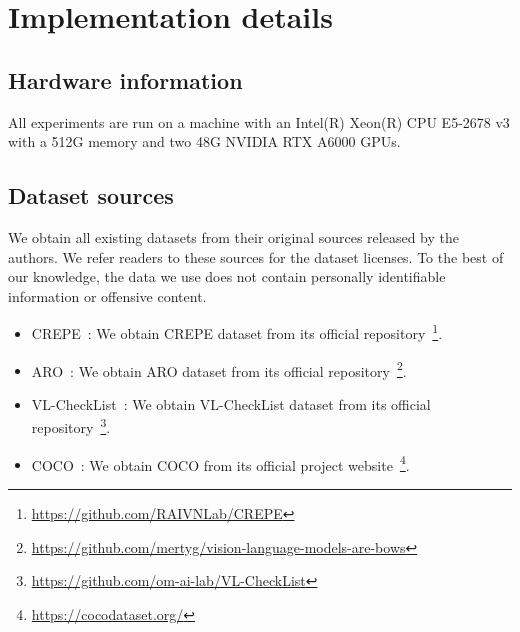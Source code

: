 

\section{Implementation details}


\subsection{Hardware information}
All experiments are run on a machine with an Intel(R) Xeon(R) CPU E5-2678 v3 with a 512G memory and two 48G NVIDIA RTX A6000 GPUs.


\subsection{Dataset sources}
We obtain all existing datasets from their original sources released by the authors.
We refer readers to these sources for the dataset licenses. To the best of our knowledge, the data we use does not contain personally identifiable information or offensive content.

\begin{itemize}
    \item CREPE~\cite{ma2022crepe}: We obtain CREPE dataset from its official repository~\footnote{\url{https://github.com/RAIVNLab/CREPE}}.

    \item ARO~\cite{yuksekgonul2023when}: We obtain ARO dataset from its official repository~\footnote{\url{https://github.com/mertyg/vision-language-models-are-bows}}.

    \item VL-CheckList~\cite{zhao2022vl}: We obtain VL-CheckList dataset from its official repository~\footnote{\url{https://github.com/om-ai-lab/VL-CheckList}}.

    \item COCO~\cite{lin2014microsoft}: We obtain COCO from its official project website~\footnote{\url{https://cocodataset.org/}}.
\end{itemize}



